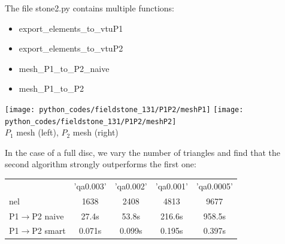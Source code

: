The file {\pythonfile stone2.py} contains multiple functions:
\begin{itemize}
\item {\python export\_elements\_to\_vtuP1}
\item {\python export\_elements\_to\_vtuP2}
\item {\python mesh\_P1\_to\_P2\_naive}
\item {\python mesh\_P1\_to\_P2}
\end{itemize}

\begin{center}
\texttt{[image: python\_codes/fieldstone\_131/P1P2/meshP1]}
\texttt{[image: python\_codes/fieldstone\_131/P1P2/meshP2]}\\
{\captionfont $P_1$ mesh (left), $P_2$ mesh (right)}
\end{center}

In the case of a full disc, we vary the number of triangles and find that 
the second algorithm strongly outperforms the first one:
 
\begin{center}
\begin{tabular}{|l|c|c|c|c|}
\hline
                       & 'qa0.003' & 'qa0.002' & 'qa0.001' & 'qa0.0005' \\
nel                    & 1638      & 2408      & 4813 &  9677\\
\hline
P1$\rightarrow$P2 naive& 27.4s      & 53.8s     & 216.6s & 958.5s\\
P1$\rightarrow$P2 smart& 0.071s     & 0.099s    & 0.195s & 0.397s\\
\hline
\end{tabular}
\end{center}




